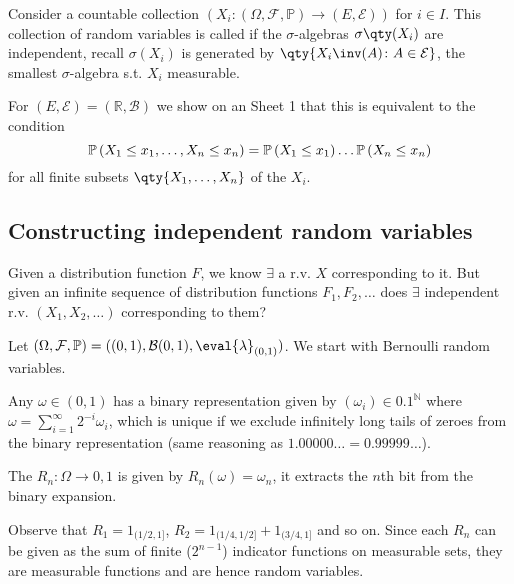 \begin{definition}[Independent]
	Consider a countable collection $(X_i \colon (\Omega, \mathcal F, \mathbb P) \to (E, \mathcal E))$ for $i \in I$.
	This collection of random variables is called  if the $\sigma$-algebras $\sigma\qty(X_i)$ are independent, recall $\sigma(X_i) $ is generated by $\qty{X_i\inv(A) \colon A \in \mathcal E}$, the smallest $\sigma$-algebra s.t. $X_i$ measurable.
\end{definition}

For $(E, \mathcal E) = (\mathbb R, \mathcal B)$ we show on an Sheet 1 that this is equivalent to the condition
\[ \mathbb{P}\left({X_1 \leq x_1, \dots, X_n \leq x_n}\right) = \mathbb{P}\left({X_1 \leq x_1}\right) \dots \mathbb{P}\left({X_n \leq x_n}\right) \]
for all finite subsets $\qty{X_1, \dots, X_n}$ of the $X_i$.

\subsection{Constructing independent random variables}

\begin{question}
	Given a distribution function $F$, we know $\exists$ a r.v. $X$ corresponding to it.
	But given an infinite sequence of distribution functions $F_1, F_2, \dots$ does $\exists$ independent r.v. $(X_1, X_2, \dots)$ corresponding to them?
\end{question}

Let $(\Omega, \mathcal F, \mathbb P) = ((0,1), \mathcal B(0, 1), \eval{\lambda}_{(0,1)})$.
We start with Bernoulli random variables.

Any $\omega \in (0,1)$ has a binary representation given by $(\omega_i) \in \qty{0,1}^{\mathbb N}$ where $\omega = \sum_{i=1}^{\infty} 2^{-i} \omega_i$, which is unique if we exclude infinitely long tails of zeroes from the binary representation (same reasoning as $1.00000\ldots = 0.99999\dots$).

\begin{definition}
	The  $R_n : \Omega \to {0, 1}$ is given by $R_n(\omega) = \omega_n$, it extracts the $n$th bit from the binary expansion.
\end{definition}

Observe that $R_1 = 1_{(1/2, 1]}$, $R_2 = 1_{(1/4, 1/2]} + 1_{(3/4, 1]}$ and so on.
Since each $R_n$ can be given as the sum of finite ($2^{n-1}$) indicator functions on measurable sets, they are measurable functions and are hence random variables.

